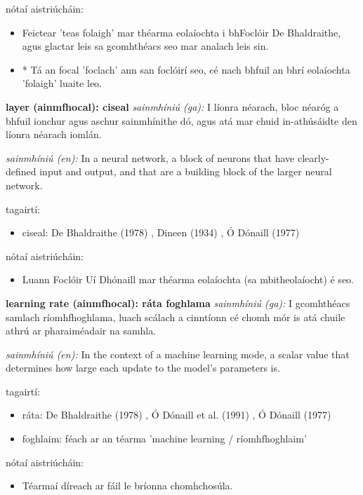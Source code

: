 \documentclass{article}
\begin{document}
nótaí aistriúcháin:
\begin{itemize}
	\item Feictear 'teas folaigh' mar théarma eolaíochta i bhFoclóir De Bhaldraithe, agus glactar leis sa gcomhthéacs seo mar analach leis sin.
	\item * Tá an focal 'foclach' ann san foclóirí seo, cé nach bhfuil an bhrí eolaíochta 'folaigh' luaite leo.
\end{itemize}


\textbf{layer (ainmfhocal): ciseal}
\textit{sainmhíniú (ga):} I líonra néarach, bloc néaróg a bhfuil ionchur agus aschur sainmhínithe dó, agus atá mar chuid in-athúsáidte den líonra néarach iomlán.

\textit{sainmhíniú (en):} In a neural network, a block of neurons that have clearly-defined input and output, and that are a building block of the larger neural network.

tagairtí:
\begin{itemize}
	\item ciseal: De Bhaldraithe (1978) \cite{de-bhaldraithe}, Dineen (1934) \cite{dineen}, Ó Dónaill (1977) \cite{odonaill}
\end{itemize}

nótaí aistriúcháin:
\begin{itemize}
	\item Luann Foclóir Uí Dhónaill mar théarma eolaíochta (sa mbitheolaíocht) é seo.
\end{itemize}


\textbf{learning rate (ainmfhocal): ráta foghlama}
\textit{sainmhíniú (ga):} I gcomhthéacs samlach ríomhfhoghlama, luach scálach a cinntíonn cé chomh mór is atá chuile athrú ar pharaiméadair na samhla.

\textit{sainmhíniú (en):} In the context of a machine learning mode, a scalar value that determines how large each update to the model's parameters is.

tagairtí:
\begin{itemize}
	\item ráta: De Bhaldraithe (1978) \cite{de-bhaldraithe}, Ó Dónaill et al. (1991) \cite{focloir-beag}, Ó Dónaill (1977) \cite{odonaill}
	\item foghlaim: féach ar an téarma 'machine learning / ríomhfhoghlaim'
\end{itemize}

nótaí aistriúcháin:
\begin{itemize}
	\item Téarmaí díreach ar fáil le bríonna chomhchosúla.
\end{itemize}
\end{document}
